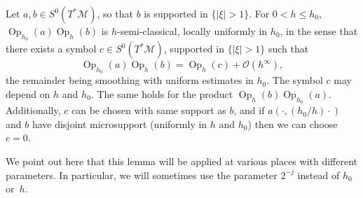 \documentclass[AHL,Unicode,longabstracts,published]{cedram}
\newcommand{\M}{\mathcal{M}}
\newcommand{\clO}{\mathcal{O}}
\DeclareMathOperator{\Op}{Op}
\begin{document}
\begin{lemm}\label{lemma:bound-composition}
Let $a, b \in S^0(T^*\M)$, so that $b$ is supported in $\{ |\xi|> 1\}$. For $0< h \leq h_0$, $\Op_{h_0}(a)\Op_h(b)$ is $h$-semi-classical, locally uniformly in $h_0$, in the sense that there exists a symbol $c \in S^0(T^*\M)$, supported in $\{ |\xi|>1\}$ such that
\begin{equation}\label{equation:bound-composition}
\Op_{h_0}(a)\Op_h(b) = \Op_h(c) + \clO(h^\infty),
\end{equation}
the remainder being smoothing with uniform estimates in $h_0$. The symbol $c$ may depend on $h$ and $h_0$. The same holds for the product $\Op_h(b)\Op_{h_0}(a)$. Additionally, $c$ can be chosen with same support as $b$, and if $a(\cdot, (h_0/h)\cdot)$ and $b$ have disjoint microsupport (uniformly in $h$ and $h_0$) then we can choose $c=0$.
\end{lemm}

We point out here that this lemma will be applied at various places with different parameters. In particular, we will sometimes use the parameter $2^{-j}$ instead of $h_0$ or~$h$.
\end{document}
